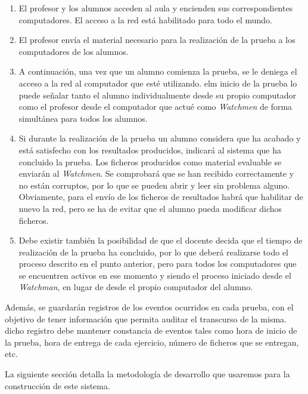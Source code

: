 \begin{enumerate}
	\item El profesor y los alumnos acceden al aula y encienden sus correspondientes computadores. El acceso a la red está habilitado para todo el mundo.
	\item El profesor envía el material necesario para la realización de la prueba a los computadores de los alumnos.
	\item A continuación, una vez que un alumno comienza la prueba, se le deniega el acceso a la red al computador que esté utilizando. elm inicio de la prueba lo puede señalar tanto el alumno individualmente desde su propio computador como el profesor desde el computador que actué como \emph{Watchmen} de forma simultánea para todos los alumnos.
	\item Si durante la realización de la prueba un alumno considera que ha acabado y está satisfecho con los resultados producidos, indicará al sistema que ha concluido la prueba. Los ficheros producidos como material evaluable se enviarán al \emph{Watchmen}. Se comprobará que se han recibido correctamente y no están corruptos, por lo que se pueden abrir y leer sin problema alguno. Obviamente, para el envío de los ficheros de resultados habrá que habilitar de nuevo la red, pero se ha de evitar que el alumno pueda modificar dichos ficheros.
	\item Debe existir también la posibilidad de que el docente decida que el tiempo de realización de la prueba ha concluido, por lo que deberá realizarse todo el proceso descrito en el punto anterior, pero para todos los computadores que se encuentren activos en ese momento y siendo el proceso iniciado desde el \emph{Watchman}, en lugar de desde el propio computador del alumno.
\end{enumerate}

Además, se guardarán registros de los eventos ocurridos en cada prueba, con el objetivo de tener información que permita auditar el transcurso de la misma. dicho registro debe mantener constancia de eventos tales como hora de inicio de la prueba, hora de entrega de cada ejercicio, número de ficheros que se entregan, etc.

La siguiente sección detalla la metodología de desarrollo que usaremos para la construcción de este sistema.

